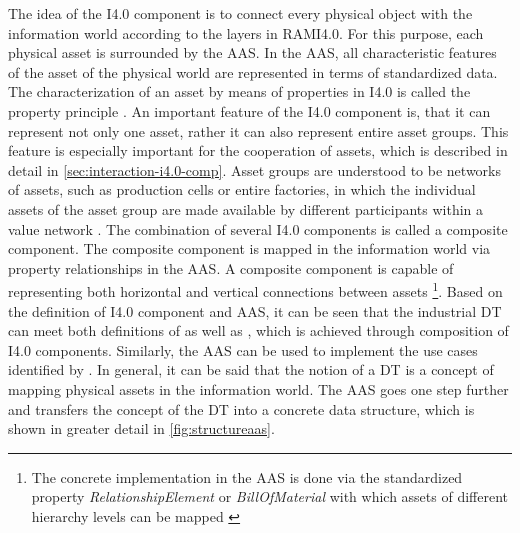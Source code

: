 The idea of the \ac{I4.0} component is to connect every physical object with the information world according to the layers in \ac{RAMI4.0}. For this purpose, each physical asset is surrounded by the \ac{AAS}. In the \ac{AAS}, all characteristic features of the asset of the physical world are represented in terms of standardized data. The characterization of an asset by means of properties in \ac{I4.0} is called the property principle \cite[p. 17]{Heidel2017ReferenzarchitekturmodellIndustrie4.0Komponente}. An important feature of the \ac{I4.0} component is, that it can represent not only one asset, rather it can also represent entire asset groups. This feature is especially important for the cooperation of assets, which is described in detail in \ref{sec:interaction-i4.0-comp}. Asset groups are understood to be networks of assets, such as production cells or entire factories, in which the individual assets of the asset group are made available by different participants within a value network \cite[p. 11]{Bedenbender2017BeziehungenProduktion}. The combination of several \ac{I4.0} components is called a composite component. The composite component is mapped in the information world via property relationships in the \ac{AAS}. A composite component is capable of representing both horizontal and vertical connections between assets \cite[p. 13]{Bedenbender2017BeziehungenProduktion} \footnote{The concrete implementation in the \ac{AAS} is done via the standardized property \textit{RelationshipElement} or \textit{BillOfMaterial} with which assets of different hierarchy levels can be mapped \cite[p. 32]{Bader2020Details3.0RC01}}.  Based on the definition of \ac{I4.0} component and \ac{AAS}, it can be seen that the industrial \ac{DT} can meet both definitions of \citet{Rosen2015AboutManufacturing} as well as \citet{Schluse2016FromSystems}, which is achieved through composition of \ac{I4.0} components. Similarly, the \ac{AAS} can be used to implement the use cases identified by \citet{Son2021PastManufacturing}. In general, it can be said that the notion of a \ac{DT} is a concept of mapping physical assets in the information world. The \ac{AAS} goes one step further and transfers the concept of the \ac{DT} into a concrete data structure, which is shown in greater detail in \ref{fig:structureaas}.

